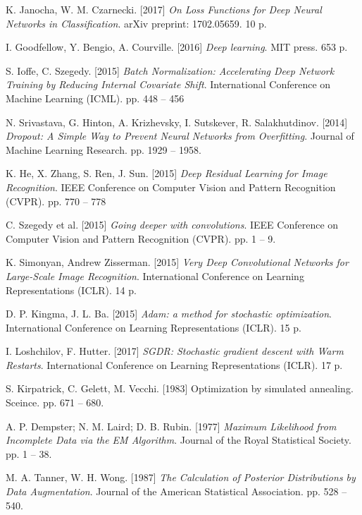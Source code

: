 \begin{thebibliography}{99}
     K. Janocha, W. M. Czarnecki. [2017]
     \textit{On Loss Functions for Deep Neural Networks in Classification}.
     arXiv preprint: 1702.05659.
     10 p.
     	
     I. Goodfellow, Y. Bengio, A. Courville. [2016]
     \textit{Deep learning}.
     MIT press.
     653 p.

	 S. Ioffe, C. Szegedy. [2015]
	 \textit{Batch Normalization: Accelerating Deep Network Training by 
	 Reducing Internal Covariate Shift}. 
	 International Conference on Machine Learning (ICML).
	 pp. 448 -- 456
	 
	 N. Srivastava, G. Hinton, A. Krizhevsky, I. Sutskever, R. Salakhutdinov. [2014]
	 \textit{Dropout: A Simple Way to Prevent Neural Networks from Overfitting}.
	 Journal of Machine Learning Research.
	 pp. 1929 -- 1958.
	 
	 K. He, X. Zhang, S. Ren, J. Sun. [2015]
	 \textit{Deep Residual Learning for Image Recognition}.
	 IEEE Conference on Computer Vision and Pattern Recognition (CVPR).
	 pp. 770 -- 778
	 
	 C. Szegedy et al. [2015]
	 \textit{Going deeper with convolutions}.
	 IEEE Conference on Computer Vision and Pattern Recognition (CVPR).
	 pp. 1 -- 9.
	 
	 K. Simonyan, Andrew Zisserman. [2015]
	 \textit{Very Deep Convolutional Networks for Large-Scale Image Recognition}.
	 International Conference on Learning Representations (ICLR).
	 14 p.
	 
	 D. P. Kingma, J. L. Ba. [2015]
	 \textit{Adam: a method for stochastic optimization}.
	 International Conference on Learning Representations (ICLR).
	 15 p.
	 
	 I. Loshchilov, F. Hutter. [2017]
	 \textit{SGDR: Stochastic gradient descent with Warm Restarts}.
	 International Conference on Learning Representations (ICLR).
	 17 p.
	 	 
	 S. Kirpatrick, C. Gelett, M. Vecchi. [1983]
	 Optimization by simulated annealing.
	 Sceince.
	 pp. 671 -- 680.
	 
	A. P. Dempster; N. M. Laird; D. B. Rubin. [1977]
	\textit{Maximum Likelihood from Incomplete Data via the EM Algorithm}.
	Journal of the Royal Statistical Society.
	pp. 1 -- 38.
	 
	M. A. Tanner, W. H. Wong. [1987]
	\textit{The Calculation of Posterior Distributions by Data Augmentation}.
	Journal of the American Statistical Association.
	pp. 528 -- 540.
	
\end{thebibliography}
